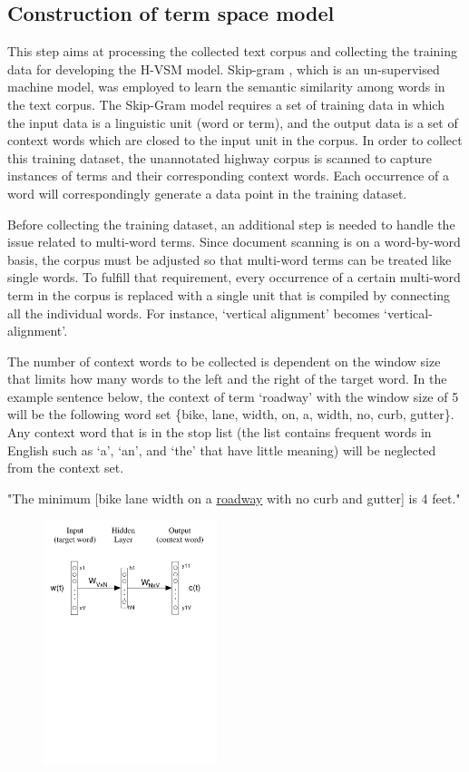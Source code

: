\documentclass[Journal,InsideFigs, DoubleSpace]{ascelike} %
\begin{document}
{\subsection{Construction of term space model}
%
This step aims at processing the collected text corpus and collecting the training data for developing the H-VSM model. Skip-gram \cite{mikolov13a}, which is an un-supervised machine model, was employed to learn the semantic similarity among words in the text corpus. The Skip-Gram model requires a set of training data in which the input data is a linguistic unit (word or term), and the output data is a set of context words which are closed to the input unit in the corpus. In order to collect this training dataset, the unannotated highway corpus is scanned to capture instances of terms and their corresponding context words. Each occurrence of a word will correspondingly generate a data point in the training dataset.
\par
Before collecting the training dataset, an additional step is needed to handle the issue related to multi-word terms. Since document scanning is on a word-by-word basis, the corpus must be adjusted so that multi-word terms can be treated like single words. To fulfill that requirement, every occurrence of a certain multi-word term in the corpus is replaced with a single unit that is compiled by connecting all the individual words. For instance, `vertical alignment' becomes `vertical-alignment'.
\par
The number of context words to be collected is dependent on the window size that limits how many words to the left and the right of the target word. In the example sentence below, the context of term `roadway' with the window size of 5 will be the following word set \{bike, lane, width, on, a, width, no, curb, gutter\}. Any context word that is in the stop list (the list contains frequent words in English such as `a', `an', and `the' that have little meaning) will be neglected from the context set.
%
\begin{center}
	"The minimum [bike lane width on a \underline{roadway} with no curb and gutter] is 4 feet."
\end{center}
%
%
\begin{figure}[t]
	\centering
	\includegraphics[width=0.45\textwidth]{Figure4_skip-gram-model}

\end{figure}}
\end{document}
